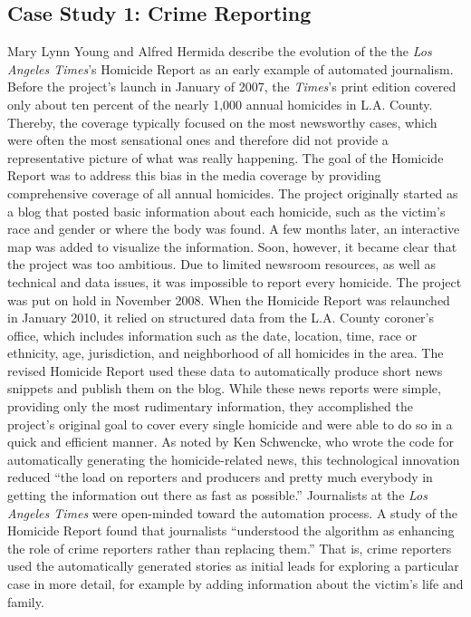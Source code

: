 \documentclass[notoc, symmetric, nobib, nols]{towcenter-guideto-book}
\begin{document}
\subsection{Case Study 1: Crime Reporting}
\begin{framed}
Mary Lynn Young and Alfred Hermida describe the evolution of the the \textit{Los Angeles Times}'s Homicide Report as an early example of automated journalism.\autocite{young15} Before the project's launch in January of 2007, the \textit{Times}'s print edition covered only about ten percent of the nearly 1,000 annual homicides in L.A. County. Thereby, the coverage typically focused on the most newsworthy cases, which were often the most sensational ones and therefore did not provide a representative picture of what was really happening. The goal of the Homicide Report was to address this bias in the media coverage by providing comprehensive coverage of all annual homicides. The project originally started as a blog that posted basic information about each homicide, such as the victim's race and gender or where the body was found. A few months later, an interactive map was added to visualize the information. Soon, however, it became clear that the project was too ambitious. Due to limited newsroom resources, as well as technical and data issues, it was impossible to report every homicide. The project was put on hold in November 2008. When the Homicide Report was relaunched in January 2010, it relied on structured data from the L.A. County coroner's office, which includes information such as the date, location, time, race or ethnicity, age, jurisdiction, and neighborhood of all homicides in the area. The revised Homicide Report used these data to automatically produce short news snippets and publish them on the blog. While these news reports were simple, providing only the most rudimentary information, they accomplished the project's original goal to cover every single homicide and were able to do so in a quick and efficient manner. As noted by Ken Schwencke, who wrote the code for automatically generating the homicide-related news, this technological innovation reduced ``the load on reporters and producers and pretty much everybody in getting the information out there as fast as possible.''\autocite{young15} Journalists at the \textit{Los Angeles Times} were open-minded toward the automation process. A study of the Homicide Report found that journalists ``understood the algorithm as enhancing the role of crime reporters rather than replacing them.''\autocite{young15} That is, crime reporters used the automatically generated stories as initial leads for exploring a particular case in more detail, for example by adding information about the victim's life and family. 


\end{framed}
\end{document}
